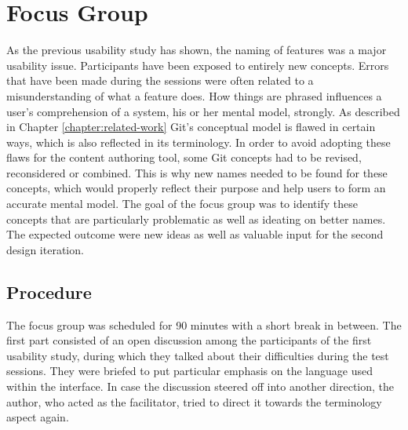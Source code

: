 \chapter{Focus Group} \label{chapter:focus-group}
As the previous usability study has shown, the naming of features was a major usability issue. Participants have been exposed to entirely new concepts. Errors that have been made during the sessions were often related to a misunderstanding of what a feature does. How things are phrased influences a user’s comprehension of a system, his or her mental model, strongly. As described in Chapter \ref{chapter:related-work} Git's conceptual model is flawed in certain ways, which is also reflected in its terminology. In order to avoid adopting these flaws for the content authoring tool, some Git concepts had to be revised, reconsidered or combined. This is why new names needed to be found for these concepts, which would properly reflect their purpose and help users to form an accurate mental model. The goal of the focus group was to identify these concepts that are particularly problematic as well as ideating on better names. The expected outcome were new ideas as well as valuable input for the second design iteration.





\section{Procedure}
The focus group was scheduled for 90 minutes with a short break in between. The first part consisted of an open discussion among the participants of the first usability study, during which they talked about their difficulties during the test sessions. They were briefed to put particular emphasis on the language used within the interface. In case the discussion steered off into another direction, the author, who acted as the facilitator, tried to direct it towards the terminology aspect again.

